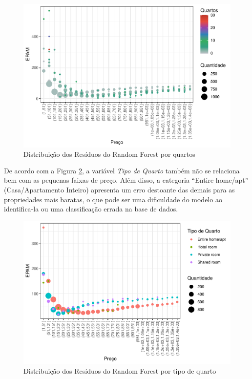\documentclass[
	12pt,				%
	a4paper,		%
	oneside,    %
	chapter=TITLE,		   %
	section=TITLE,		   %
	subsection=TITLE,	   %
	subsubsection=TITLE, %
	english,			%
	french,				%
	spanish,			%
	brazil,				%
]{abntex2}
\begin{document}
\begin{figure}
\centering
\includegraphics{00-TCC_files/figure-latex/unnamed-chunk-43-1.pdf}
\caption{\label{graf_resid_rf_quartos}Distribuição dos Resíduos do
Random Forest por quartos}
\end{figure}

De acordo com a Figura \ref{graf_resid_rf_tp_quarto}, a variável
\emph{Tipo de Quarto} também não se relaciona bem com as pequenas faixas
de preço. Além disso, a categoria ``Entire home/apt'' (Casa/Apartamento
Inteiro) apresenta um erro destoante das demais para as propriedades
mais baratas, o que pode ser uma dificuldade do modelo ao identifica-la
ou uma classificação errada na base de dados.

\begin{figure}
\centering
\includegraphics{00-TCC_files/figure-latex/graf_resid_rf_tp_quarto-1.pdf}
\caption{\label{graf_resid_rf_tp_quarto}Distribuição dos Resíduos do
Random Forest por tipo de quarto}
\end{figure}
\end{document}
